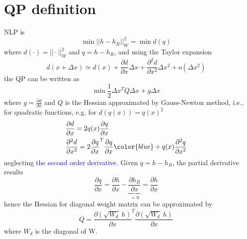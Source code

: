 \documentclass{article}
\begin{document}
\section{QP definition}
NLP is
\begin{equation}
    \min ||h-h_R||^2_W = \min d(q)
\end{equation}
where $d(\cdot) = ||\cdot||^2_W$ and $q = h-h_R$, and using the Taylor expansion
\begin{equation}
    d(x+\Delta x) \simeq d(x) + \frac{\partial d}{\partial x}\Delta x + \frac{\partial ^2 d}{\partial x^2} \Delta x^2 + o(\Delta x ^2)
\end{equation}
the QP can be written as 
\begin{equation}
\min \frac{1}{2} \Delta x ^T Q \Delta x + g \Delta x
\end{equation}
where $g = \frac{\partial d}{\partial x}$ and $Q$ is the Hessian approximated by Gauss-Newton method, i.e., for quadratic functions, e.g. for $d(q(x)) = q(x)^2$
\begin{equation}
\begin{aligned}
    & \frac{\partial d}{\partial x} = 2 q(x) \frac{\partial q}{\partial x}\\
    & \frac{\partial^2 d}{\partial x^2} = 2 \frac{\partial q}{\partial x}^T \frac{\partial q}{\partial x} {\color{blue}+ q(x) \frac{\partial^2 q}{\partial x^2}}
\end{aligned}
\end{equation}
neglecting \textcolor{blue}{the second order derivative}. Given $q = h-h_R$, the partial derivative results
\begin{equation}
    \frac{\partial q}{\partial x} = \frac{\partial h}{\partial x} - \underbrace{\frac{\partial h_R}{\partial x}}_{=0} = \frac{\partial h}{\partial x}
\end{equation}
hence the Hessian for diagonal weight matrix can be approximated by 
\begin{equation}
    Q = \frac{\partial (\sqrt{W_d}\ h)}{\partial x} ^T \frac{\partial (\sqrt{W_d} \ h)}{\partial x}
\end{equation}
where $W_d$ is the diagonal of W.





\end{document}

